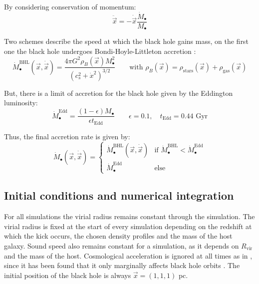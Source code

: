 			By considering conservation of momentum:
			\begin{equation}
				\ddot{\vec{x}} = - \dot{\vec{x}}\dfrac{\dot{M}_\bullet}{M_\bullet}
			\end{equation}
			
			Two schemes describe the speed at which the black hole gains mass, on the first one the black hole undergoes Bondi-Hoyle-Littleton accretion \cite{tanaka2009assembly, choksi2017recoiling}:
			\begin{equation}
				\dot{M}_\bullet^\text{BHL}(\vec{x}, \dot{\vec{x}}) = \dfrac{4\pi G^2 \rho_B(\vec{x})M^2_\bullet}{\left(c_s^2 + \dot{x}^2\right)^{3/2}} \qquad \text{with } \rho_B(\vec{x}) = \rho_\text{stars}(\vec{x}) + \rho_\text{gas}(\vec{x})
			\end{equation}
			
			But, there is a limit of accretion for the black hole given by the Eddington luminosity:
			\begin{equation}\label{eq: eddington}
				\dot{M}_\bullet^\text{Edd} = \dfrac{(1 - \epsilon)M_\bullet}{\epsilon t_\text{Edd}} \qquad \epsilon = 0.1, \quad t_\text{Edd} = 0.44 \text{ Gyr}
			\end{equation}
			
			Thus, the final accretion rate is given by:
			\begin{equation}\label{eq: finalAccretion}
				\dot{M}_\bullet(\vec{x}, \dot{\vec{x}}) = \left\{
				\begin{array}{lc}
				\dot{M}_\bullet^\text{BHL}(\vec{x}, \dot{\vec{x}}) & \text{if $\dot{M}_\bullet^\text{BHL} < \dot{M}_\bullet^\text{Edd}$} \\
				\dot{M}_\bullet^\text{Edd} & \text{else}
				\end{array}
				\right.
			\end{equation}
	
	\subsection{Initial conditions and numerical integration}
		For all simulations the virial radius remains constant through the simulation. The virial radius is fixed at the start of every simulation depending on the redshift at which the kick occurs, the chosen density profiles and the mass of the host galaxy. Sound speed also remains constant for a simulation, as it depends on $R_\text{vir}$ and the mass of the host. Cosmological acceleration is ignored at all times as in \citeauthor{tanaka2009assembly}, since it has been found that it only marginally affects black hole orbits \cite{choksi2017recoiling}. The initial position of the black hole is always $\vec{x} = (1, 1, 1)$ pc.
		
